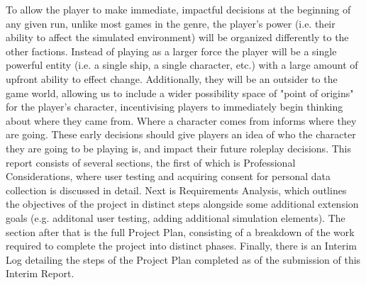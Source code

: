 \documentclass{report}
\begin{document}
To allow the player to make immediate, impactful decisions at the beginning of any given run, unlike most games in the genre, the player's power (i.e. their ability to affect the simulated environment) will be organized differently to the other factions. Instead of playing as a larger force the player will be a single powerful entity (i.e. a single ship, a single character, etc.) with a large amount of upfront ability to effect change. Additionally, they will be an outsider to the game world, allowing us to include a wider possibility space of "point of origins" for the player's character, incentivising players to immediately begin thinking about where they came from. Where a character comes from informs where they are going. These early decisions should give players an idea of who the character they are going to be playing is, and impact their future roleplay decisions.
\newline
\newline
This report consists of several sections, the first of which is Professional Considerations, where user testing and acquiring consent for personal data collection is discussed in detail. Next is Requirements Analysis, which outlines the objectives of the project in distinct steps alongside some additional extension goals (e.g. additonal user testing, adding additional simulation elements). The section after that is the full Project Plan, consisting of a breakdown of the work required to complete the project into distinct phases. Finally, there is an Interim Log detailing the steps of the Project Plan completed as of the submission of this Interim Report.
\end{document}
